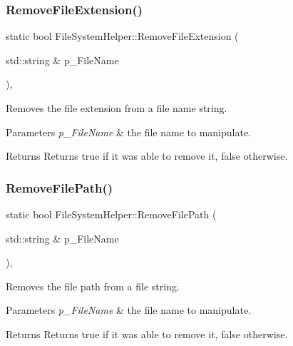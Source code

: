 \subsubsection{\texorpdfstring{RemoveFileExtension()}{RemoveFileExtension()}}
{\footnotesize\ttfamily static bool File\+System\+Helper\+::\+Remove\+File\+Extension (\begin{DoxyParamCaption}\item[{std\+::string \&}]{p\+\_\+\+File\+Name }\end{DoxyParamCaption})\hspace{0.3cm}{\ttfamily [inline]}, {\ttfamily [static]}}



Removes the file extension from a file name string. 


\begin{DoxyParams}{Parameters}
{\em p\+\_\+\+File\+Name} & the file name to manipulate. \\
\hline
\end{DoxyParams}
\begin{DoxyReturn}{Returns}
Returns true if it was able to remove it, false otherwise. 
\end{DoxyReturn}
\mbox{\label{class_file_system_helper_a44c0bd94522601736244ff130c646824}} 
\subsubsection{\texorpdfstring{RemoveFilePath()}{RemoveFilePath()}}
{\footnotesize\ttfamily static bool File\+System\+Helper\+::\+Remove\+File\+Path (\begin{DoxyParamCaption}\item[{std\+::string \&}]{p\+\_\+\+File\+Name }\end{DoxyParamCaption})\hspace{0.3cm}{\ttfamily [inline]}, {\ttfamily [static]}}



Removes the file path from a file string. 


\begin{DoxyParams}{Parameters}
{\em p\+\_\+\+File\+Name} & the file name to manipulate. \\
\hline
\end{DoxyParams}
\begin{DoxyReturn}{Returns}
Returns true if it was able to remove it, false otherwise. 
\end{DoxyReturn}
\mbox{\label{class_file_system_helper_a0f895fcbc7e172821aac5b3b9c689d19}} 
